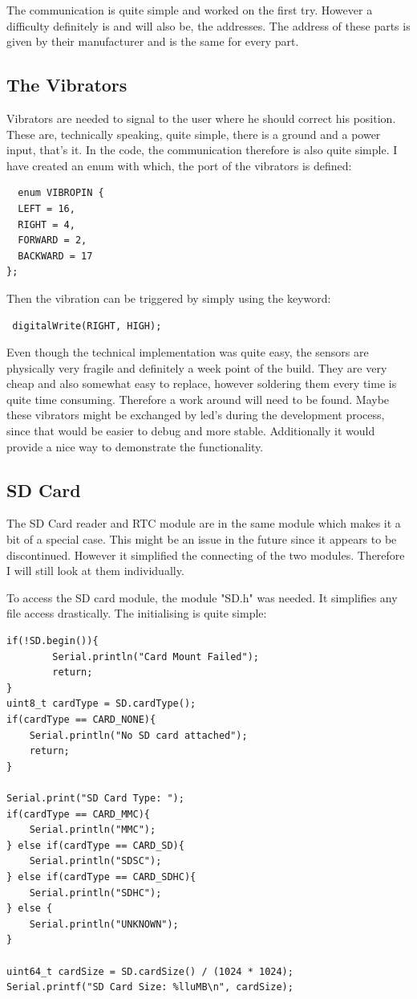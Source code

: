 The communication is quite simple and worked on the first try. However a difficulty definitely is and will also be, the addresses. The address of these parts is given by their manufacturer and is the same for every part. 

\subsection{The Vibrators}

Vibrators are needed to signal to the user where he should correct his position. These are, technically speaking, quite simple, there is a ground and a power input, that's it. In the code, the communication therefore is also quite simple. 
I have created an enum with which, the port of the vibrators is defined:
\begin{lstlisting}
  enum VIBROPIN {
  LEFT = 16,
  RIGHT = 4,
  FORWARD = 2,
  BACKWARD = 17
};
\end{lstlisting}
Then the vibration can be triggered by simply using the keyword:
\begin{lstlisting}
 digitalWrite(RIGHT, HIGH);
\end{lstlisting}

Even though the technical implementation was quite easy, the sensors are physically very fragile and definitely a week point of the build. They are very cheap and also somewhat easy to replace, however soldering them every time is quite time consuming. Therefore a work around will need to be found. Maybe these vibrators might be exchanged by led's during the development process, since that would be easier to debug and more stable. Additionally it would provide a nice way to demonstrate the functionality. 


\subsection{SD Card}

The SD Card reader and RTC module are in the same module which makes it a bit of a special case. This might be an issue in the future since it appears to be discontinued. However it simplified the connecting of the two modules. Therefore I will still look at them individually. 

To access the SD card module, the module "SD.h" was needed. It simplifies any file access drastically. The initialising is quite simple:

\begin{lstlisting}
if(!SD.begin()){
        Serial.println("Card Mount Failed");
        return;
}
uint8_t cardType = SD.cardType();
if(cardType == CARD_NONE){
    Serial.println("No SD card attached");
    return;
}

Serial.print("SD Card Type: ");
if(cardType == CARD_MMC){
    Serial.println("MMC");
} else if(cardType == CARD_SD){
    Serial.println("SDSC");
} else if(cardType == CARD_SDHC){
    Serial.println("SDHC");
} else {
    Serial.println("UNKNOWN");
}

uint64_t cardSize = SD.cardSize() / (1024 * 1024);
Serial.printf("SD Card Size: %lluMB\n", cardSize);
\end{lstlisting}
\cite{BlogofWe42:online}

